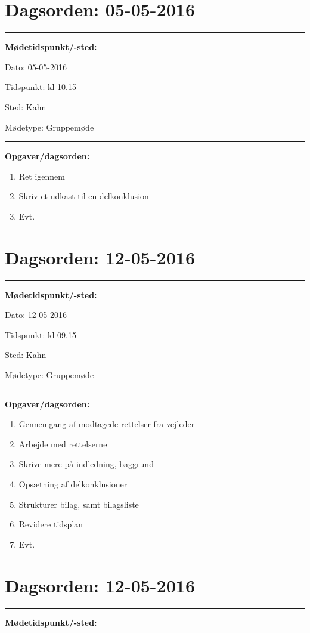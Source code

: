 \newpage 
\section{Dagsorden: 05-05-2016 }
\hrule
\textbf{Mødetidspunkt/-sted:} 

Dato: \tabto{7em} 05-05-2016

Tidspunkt: \tabto{7em} kl 10.15

Sted: \tabto{7em} Kahn 

Mødetype: \tabto{7em} Gruppemøde \newline


\hrule
\textbf{Opgaver/dagsorden:} \newline
\begin{enumerate}
	\item Ret igennem
	\item Skriv et udkast til en delkonklusion
	\item Evt. 
\end{enumerate}


\section{Dagsorden: 12-05-2016 }
\hrule
\textbf{Mødetidspunkt/-sted:} 

Dato: \tabto{7em} 12-05-2016

Tidspunkt: \tabto{7em} kl 09.15

Sted: \tabto{7em} Kahn 

Mødetype: \tabto{7em} Gruppemøde \newline


\hrule
\textbf{Opgaver/dagsorden:} \newline
\begin{enumerate}
	\item Gennemgang af modtagede rettelser fra vejleder
	\item Arbejde med rettelserne
	\item Skrive mere på indledning, baggrund
	\item Opsætning af delkonklusioner
	\item Strukturer bilag, samt bilagsliste
	\item Revidere tidsplan
	\item Evt. 
\end{enumerate}

\newpage
\section{Dagsorden: 12-05-2016 }
\hrule
\textbf{Mødetidspunkt/-sted:} 

